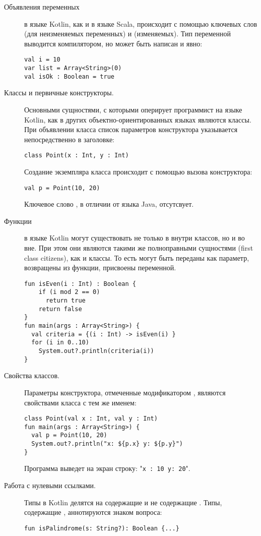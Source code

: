 \begin{description}
\item[Объявления переменных] в языке Kotlin, как и в языке Scala, происходит с помощью ключевых слов  (для неизменяемых переменных)
и  (изменяемых). Тип переменной выводится компилятором, но может быть написан и явно:
\begin{lstlisting}
val i = 10
var list = Array<String>(0)
val isOk : Boolean = true
\end{lstlisting}
	\item[Классы и первичные конструкторы.] Основными сущностями, с которыми оперирует программист на языке Kotlin, как в других объектно-ориентированных языках являются классы. При объявлении класса список параметров конструктора указывается непосредственно в заголовке:
\begin{lstlisting}
class Point(x : Int, y : Int)
\end{lstlisting}
	Создание экземпляра класса происходит с помощью вызова конструктора:
\begin{lstlisting}
val p = Point(10, 20)
\end{lstlisting}
	Ключевое слово , в отличии от языка Java, отсутсвует.
	\item[Функции] в языке Kotlin могут существовать не только в внутри классов, но и во вне. При этом они являются такими же полноправными сущностями (first class citizens), как и классы. То есть могут быть переданы как параметр, возвращены из функции, присвоены переменной. 
\begin{lstlisting}
fun isEven(i : Int) : Boolean {
    if (i mod 2 == 0)
      return true
    return false
}
fun main(args : Array<String>) {
  val criteria = {(i : Int) -> isEven(i) }
  for (i in 0..10)
    System.out?.println(criteria(i))
}
\end{lstlisting}
	\item[Свойства классов.] Параметры конструктора, отмеченные модификатором , являются свойствами класса с тем же именем:
\begin{lstlisting}
class Point(val x : Int, val y : Int)
fun main(args : Array<String>) {
  val p = Point(10, 20)
  System.out?.println("x: ${p.x} y: ${p.y}")
}
\end{lstlisting}
	Программа выведет на экран строку: "\texttt{x : 10 y: 20}".
	\item[Работа с нулевыми ссылками.] Типы в Kotlin делятся на содержащие  и не содержащие . Типы, содержащие , аннотируются знаком вопроса:
\begin{lstlisting}
fun isPalindrome(s: String?): Boolean {...}
\end{lstlisting}


\end{description}
